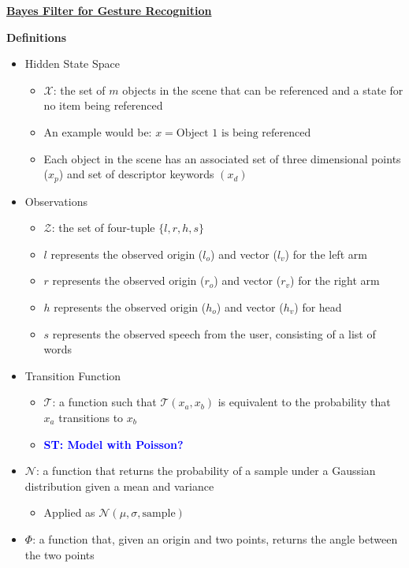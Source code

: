 \documentclass[12pt,letterpaper]{article}
\newcommand{\stnote}[1]{\textcolor{Blue}{\textbf{ST: #1}}}
\begin{document}
\begin{center}\textbf{\underline{Bayes Filter for Gesture Recognition}}\end{center}
\textbf{Definitions}
\begin{itemize}
\item{Hidden State Space}
	\begin{itemize}
	\item{$\mathcal{X}$: the set of $m$ objects in the scene that can be referenced and a state for no item being referenced}
	\item{An example would be: $x = \text{Object 1 is being referenced}$}
	\item{Each object in the scene has an associated set of three dimensional points ($x_p$) and set of descriptor keywords $(x_d)$}
	\end{itemize}
\item{Observations}
	\begin{itemize}
	\item{$\mathcal{Z}$: the set of four-tuple $\{l, r, h, s\}$}
	\item{$l$ represents the observed origin ($l_o$) and vector ($l_v$) for the left arm}
	\item{$r$ represents the observed origin  ($r_o$) and vector ($r_v$)  for the right arm}
	\item{$h$ represents the observed origin  ($h_o$) and vector ($h_v$)  for head}
	\item{$s$ represents the observed speech from the user, consisting of a list of words}
	\end{itemize}
\item{Transition Function}
	\begin{itemize}
	\item{$\mathcal{T}$: a function such that $\mathcal{T}(x_a, x_b)$ is equivalent to the probability that $x_a$ transitions to $x_b$}
	\item{\stnote{Model with Poisson?}}
	\end{itemize}
\item{$\mathcal{N}$: a function that returns the probability of a sample under a Gaussian distribution given a mean and variance}
	\begin{itemize}
	\item{Applied as $\mathcal{N}(\mu, \sigma, \text{sample})$}
	\end{itemize}
\item{$\Phi$: a function that, given an origin and two points, returns the angle between the two points}

\end{itemize}
\end{document}
